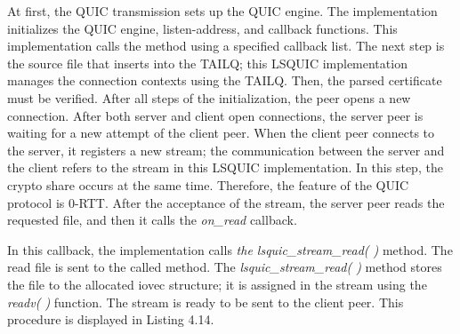 At first, the QUIC transmission sets up the QUIC engine. The implementation initializes the QUIC engine, listen-address, and callback functions. This implementation calls the method using a specified callback list. The next step is the source file that inserts into the TAILQ; this LSQUIC implementation manages the connection contexts using the TAILQ. Then, the parsed certificate must be verified. After all steps of the initialization, the peer opens a new connection.
After both server and client open connections, the server peer is waiting for a new attempt of the client peer. When the client peer connects to the server, it registers a new stream; the communication between the server and the client refers to the stream in this LSQUIC implementation. In this step, the crypto share occurs at the same time. Therefore, the feature of the QUIC protocol is 0-RTT. After the acceptance of the stream, the server peer reads the requested file, and then it calls the \textit{on\_read} callback.

In this callback, the implementation calls \textit{the lsquic\_stream\_read( )} method. The read file is sent to the called method. The \textit{lsquic\_stream\_read( )} method stores the file to the allocated iovec structure; it is assigned in the stream using the \textit{readv( )} function. The stream is ready to be sent to the client peer. This procedure is displayed in Listing 4.14.
